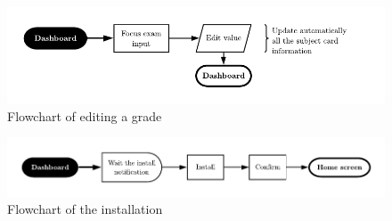 \vfill
\begin{figure}[ht!]
    \vspace*{-1.5in}
    \includegraphics[scale=1]{media/diagrams/flowchart-edit-grade.pdf}
    \vspace*{-0.125in}
    \caption{Flowchart of editing a grade}
    \label{flowchart-edit-grade}
\end{figure}
\vfill
\begin{figure}[ht!]
    \vspace*{-1.5in}
    \includegraphics[scale=1]{media/diagrams/flowchart-install.pdf}
    \vspace*{-0.125in}
    \caption{Flowchart of the installation}
    \label{flowchart-install}
\end{figure}
\vspace*{-1.5in}
\vfill





